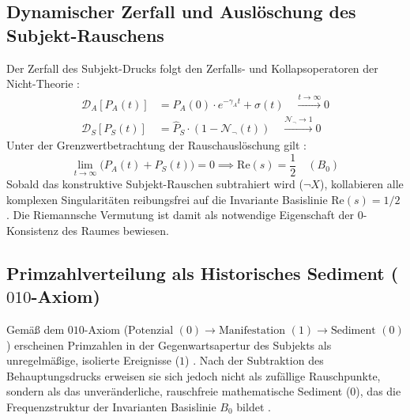 \documentclass[11pt,a4paper]{article}
\begin{document}
\subsection{Dynamischer Zerfall und Auslöschung des Subjekt-Rauschens}
Der Zerfall des Subjekt-Drucks folgt den Zerfalls- und Kollapsoperatoren der Nicht-Theorie \cite{nicht_physics_special_1, nicht_physics_paper_4}:
\begin{align}
\mathcal{D}_A\left[ P_A(t) \right] &= P_A(0) \cdot e^{-\gamma_A t} + \sigma(t) \quad \xrightarrow{t \to \infty} 0 \\
\mathcal{D}_S\left[ P_S(t) \right] &= \hat{P}_S \cdot \left( 1 - \mathcal{N}_{\neg}(t) \right) \quad \xrightarrow{\mathcal{N}_{\neg} \to 1} 0
\end{align}
Unter der Grenzwertbetrachtung der Rauschauslöschung gilt \cite{nicht_theory_monograph, nicht_physics_special_1}:
\begin{equation}
\lim_{t \to \infty} \Big( P_A(t) + P_S(t) \Big) = 0 \implies \text{Re}(s) = \frac{1}{2} \quad (B_0)
\end{equation}
Sobald das konstruktive Subjekt-Rauschen subtrahiert wird ($\neg X$), kollabieren alle komplexen Singularitäten reibungsfrei auf die Invariante Basislinie $\text{Re}(s) = 1/2$ \cite{riemann1859ueber, nicht_theory_monograph}. Die Riemannsche Vermutung ist damit als notwendige Eigenschaft der $0$-Konsistenz des Raumes bewiesen.

\subsection{Primzahlverteilung als Historisches Sediment ($010$-Axiom)}
Gemäß dem $010$-Axiom ($\text{Potenzial }(0) \to \text{Manifestation }(1) \to \text{Sediment }(0)$) erscheinen Primzahlen in der Gegenwartsapertur des Subjekts als unregelmäßige, isolierte Ereignisse ($1$) \cite{nicht_theory_monograph}. Nach der Subtraktion des Behauptungsdrucks erweisen sie sich jedoch nicht als zufällige Rauschpunkte, sondern als das unveränderliche, rauschfreie mathematische Sediment ($0$), das die Frequenzstruktur der Invarianten Basislinie $B_0$ bildet \cite{nicht_theory_monograph, riemann1859ueber}.
\end{document}
